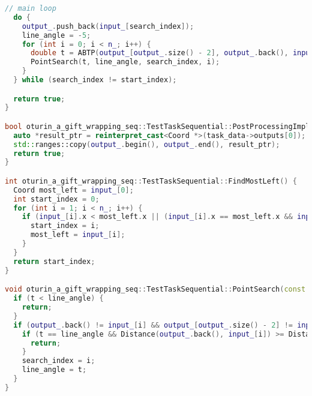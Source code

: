 \documentclass[12pt,a4paper]{extarticle}
\begin{document}
\begin{lstlisting}[language=C++]
  // main loop
  do {
    output_.push_back(input_[search_index]);
    line_angle = -5;
    for (int i = 0; i < n_; i++) {
      double t = ABTP(output_[output_.size() - 2], output_.back(), input_[i]);
      PointSearch(t, line_angle, search_index, i);
    }
  } while (search_index != start_index);

  return true;
}

bool oturin_a_gift_wrapping_seq::TestTaskSequential::PostProcessingImpl() {
  auto *result_ptr = reinterpret_cast<Coord *>(task_data->outputs[0]);
  std::ranges::copy(output_.begin(), output_.end(), result_ptr);
  return true;
}

int oturin_a_gift_wrapping_seq::TestTaskSequential::FindMostLeft() {
  Coord most_left = input_[0];
  int start_index = 0;
  for (int i = 1; i < n_; i++) {
    if (input_[i].x < most_left.x || (input_[i].x == most_left.x && input_[i].y > most_left.y)) {
      start_index = i;
      most_left = input_[i];
    }
  }
  return start_index;
}

void oturin_a_gift_wrapping_seq::TestTaskSequential::PointSearch(const double t, double &line_angle, int &search_index, const int i) {
  if (t < line_angle) {
    return;
  }
  if (output_.back() != input_[i] && output_[output_.size() - 2] != input_[i]) {
    if (t == line_angle && Distance(output_.back(), input_[i]) >= Distance(output_.back(), input_[search_index])) {
      return;
    }
    search_index = i;
    line_angle = t;
  }
}
\end{lstlisting}
\end{document}
